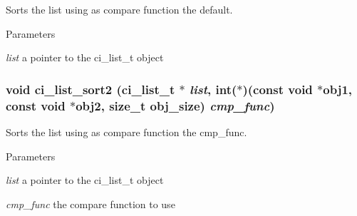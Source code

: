 Sorts the list using as compare function the default. 
\begin{DoxyParams}{Parameters}
\item[{\em list}]a pointer to the ci\_\-list\_\-t object \end{DoxyParams}
\hypertarget{group__LISTS_ga39a78437be7f9f78d6d93f69d7fe76d4}{
\subsubsection[{ci\_\-list\_\-sort2}]{\setlength{\rightskip}{0pt plus 5cm}void ci\_\-list\_\-sort2 ({\bf ci\_\-list\_\-t} $\ast$ {\em list}, \/  int($\ast$)(const void $\ast$obj1, const void $\ast$obj2, size\_\-t obj\_\-size) {\em cmp\_\-func})}}
\label{group__LISTS_ga39a78437be7f9f78d6d93f69d7fe76d4}


Sorts the list using as compare function the cmp\_\-func. 
\begin{DoxyParams}{Parameters}
\item[{\em list}]a pointer to the ci\_\-list\_\-t object \item[{\em cmp\_\-func}]the compare function to use \end{DoxyParams}
